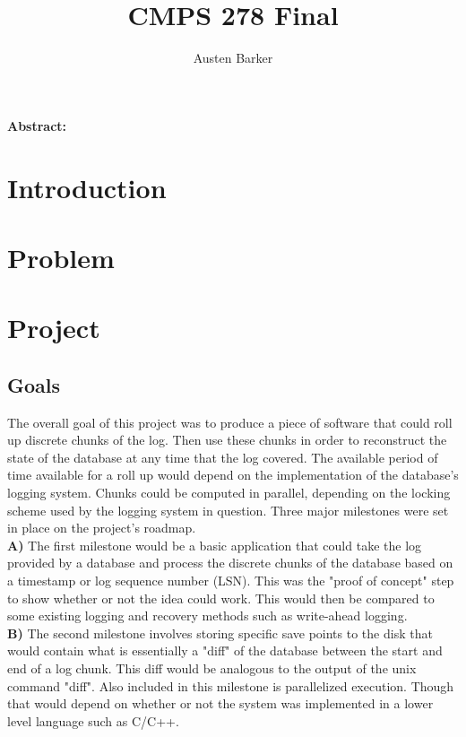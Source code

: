 \documentclass{article}
\begin{document}
\title{CMPS 278 Final}
\author{Austen Barker}
\maketitle


\textbf{Abstract:} 
\section{Introduction}
\section{Problem}
\section{Project}
\subsection{Goals}
The overall goal of this project was to produce a piece of software that could roll up discrete chunks
of the log. Then use these chunks in order to reconstruct the state of the database at any time that
the log covered. The available period of time available for a roll up would depend on the implementation
of the database's logging system. Chunks could be computed in parallel, depending on the locking scheme
used by the logging system in question. Three major milestones were set in place on the project's roadmap.\\

\textbf{A)} The first milestone would be a basic application that could take the log provided by a database
and process the discrete chunks of the database based on a timestamp or log sequence number (LSN). This was 
the "proof of concept" step to show whether or not the idea could work. This would then be compared to some
existing logging and recovery methods such as write-ahead logging.\\

\textbf{B)} The second milestone involves storing specific save points to the disk that would contain what 
is essentially a "diff" of the database between the start and end of a log chunk. This diff would be 
analogous to the output of the unix command "diff". Also included in this milestone is parallelized execution.
Though that would depend on whether or not the system was implemented in a lower level language such as C/C++.\\
\end{document}
